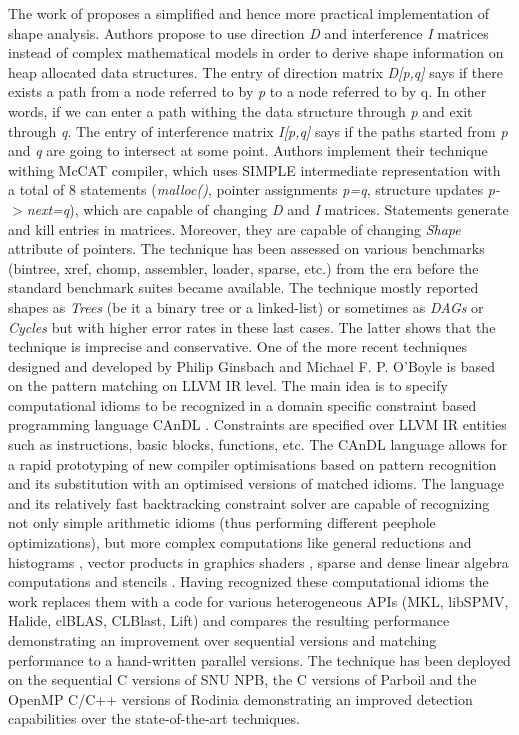 \documentclass[10pt,a4paper]{report}
\begin{document}
\quad The work of \cite{Ghiya:1996:TDC:237721.237724} proposes a simplified and hence more practical implementation of shape analysis. Authors propose to use direction \textit{D} and interference \textit{I} matrices instead of complex mathematical models in order to derive shape information on heap allocated data structures. The entry of direction matrix \textit{D[p,q]} says if there exists a path from a node referred to by \textit{p} to a node referred to by q. In other words, if we can enter a path withing the data structure through \textit{p} and exit through \textit{q}. The entry of interference matrix \textit{I[p,q]} says if the paths started from \textit{p} and \textit{q} are going to intersect at some point. Authors implement their technique withing McCAT compiler, which uses SIMPLE intermediate representation with a total of 8 statements (\textit{malloc()}, pointer assignments \textit{p=q}, structure updates \textit{p-$>$next=q}), which are capable of changing \textit{D} and \textit{I} matrices. Statements generate and kill entries in matrices. Moreover, they are capable of changing \textit{Shape} attribute of pointers. The technique has been assessed on various benchmarks (bintree, xref, chomp, assembler, loader, sparse, etc.) from the era before the standard benchmark suites became available. The technique mostly reported shapes as \textit{Trees} (be it a binary tree or a linked-list) or sometimes as \textit{DAGs} or \textit{Cycles} but with higher error rates in these last cases. The latter shows that the technique is imprecise and conservative.\newline\null
\quad One of the more recent techniques designed and developed by Philip Ginsbach and Michael F. P. O’Boyle is based on the pattern matching on LLVM IR level. The main idea is to specify computational idioms to be recognized in a domain specific constraint based programming language CAnDL \cite{Ginsbach:2018:CDS:3178372.3179515}. Constraints are specified over LLVM IR entities such as instructions, basic blocks, functions, etc. The CAnDL language allows for a rapid prototyping of new compiler optimisations based on pattern recognition and its substitution with an optimised versions of matched idioms. The language and its relatively fast backtracking constraint solver are capable of recognizing not only simple arithmetic idioms (thus performing different peephole optimizations), but more complex computations like general reductions and histograms \cite{Ginsbach:2017:DEG:3049832.3049862}, vector products in graphics shaders \cite{Ginsbach:2018:AML:3296957.3173182}, sparse and dense linear algebra computations and stencils \cite{Ginsbach:2018:AML:3296957.3173182}. Having recognized these computational idioms the work \cite{Ginsbach:2018:AML:3296957.3173182} replaces them with a code for various heterogeneous APIs (MKL, libSPMV, Halide, clBLAS, CLBlast, Lift) and compares the resulting performance demonstrating an improvement over sequential versions and matching performance to a hand-written parallel versions. The technique has been deployed on the sequential C versions of SNU NPB, the C versions of Parboil and the OpenMP C/C++ versions of Rodinia demonstrating an improved detection capabilities over the state-of-the-art techniques.\newline\null
\end{document}
